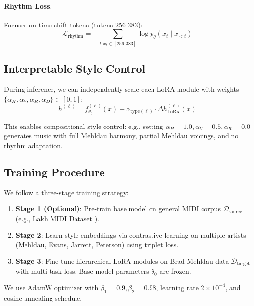 \documentclass{article}
\begin{document}
\paragraph{Rhythm Loss.}
Focuses on time-shift tokens (tokens 256-383):
\begin{equation}
    \mathcal{L}_{\text{rhythm}} = -\sum_{t: x_t \in [256,383]} \log p_\theta(x_t \mid x_{<t})
\end{equation}

\subsection{Interpretable Style Control}

During inference, we can independently scale each LoRA module with weights $\{\alpha_H, \alpha_V, \alpha_R, \alpha_D\} \in [0, 1]$:
\begin{equation}
    h^{(\ell)} = f_{\theta_0}^{(\ell)}(x) + \alpha_{\text{type}(\ell)} \cdot \Delta h_{\text{LoRA}}^{(\ell)}(x)
\end{equation}

This enables compositional style control: e.g., setting $\alpha_H = 1.0, \alpha_V = 0.5, \alpha_R = 0.0$ generates music with full Mehldau harmony, partial Mehldau voicings, and no rhythm adaptation.

\subsection{Training Procedure}

We follow a three-stage training strategy:

\begin{enumerate}
    \item \textbf{Stage 1 (Optional)}: Pre-train base model on general MIDI corpus $\mathcal{D}_{\text{source}}$ (e.g., Lakh MIDI Dataset \cite{raffel2016learning}).

    \item \textbf{Stage 2}: Learn style embeddings via contrastive learning on multiple artists (Mehldau, Evans, Jarrett, Peterson) using triplet loss.

    \item \textbf{Stage 3}: Fine-tune hierarchical LoRA modules on Brad Mehldau data $\mathcal{D}_{\text{target}}$ with multi-task loss. Base model parameters $\theta_0$ are frozen.
\end{enumerate}

We use AdamW optimizer \cite{loshchilov2017decoupled} with $\beta_1=0.9, \beta_2=0.98$, learning rate $2 \times 10^{-4}$, and cosine annealing schedule.
\end{document}
